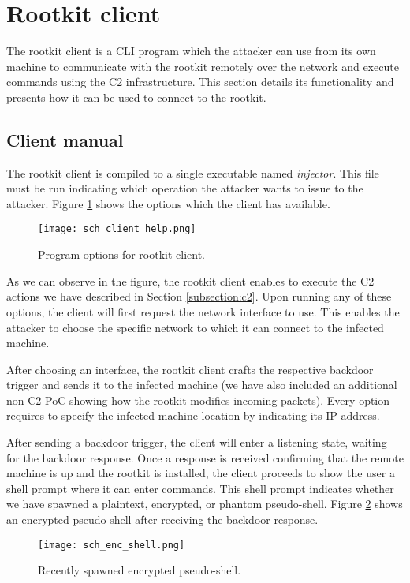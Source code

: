 \section{Rootkit client}
The rootkit client is a CLI program which the attacker can use from its own machine to communicate with the rootkit remotely over the network and execute commands using the C2 infrastructure. This section details its functionality and presents how it can be used to connect to the rootkit.

\subsection{Client manual} \label{subsection:rootkit_manual}
The rootkit client is compiled to a single executable named \textit{injector}. This file must be run indicating which operation the attacker wants to issue to the attacker. Figure \ref{fig:client_help} shows the options which the client has available.

\begin{figure}[htbp]
	\centering
	\texttt{[image: sch\_client\_help.png]}
	\caption{Program options for rootkit client.}
	\label{fig:client_help}
\end{figure}

As we can observe in the figure, the rootkit client enables to execute the C2 actions we have described in Section \ref{subsection:c2}. Upon running any of these options, the client will first request the network interface to use. This enables the attacker to choose the specific network to which it can connect to the infected machine.

After choosing an interface, the rootkit client crafts the respective backdoor trigger and sends it to the infected machine (we have also included an additional non-C2 PoC showing how the rootkit modifies incoming packets). Every option requires to specify the infected machine location by indicating its IP address.

After sending a backdoor trigger, the client will enter a listening state, waiting for the backdoor response. Once a response is received confirming that the remote machine is up and the rootkit is installed, the client proceeds to show the user a shell prompt where it can enter commands. This shell prompt indicates whether we have spawned a plaintext, encrypted, or phantom pseudo-shell. Figure \ref{fig:enc_shell} shows an encrypted pseudo-shell after receiving the backdoor response.

\begin{figure}[htbp]
	\centering
	\texttt{[image: sch\_enc\_shell.png]}
	\caption{Recently spawned encrypted pseudo-shell.}
	\label{fig:enc_shell}
\end{figure}

